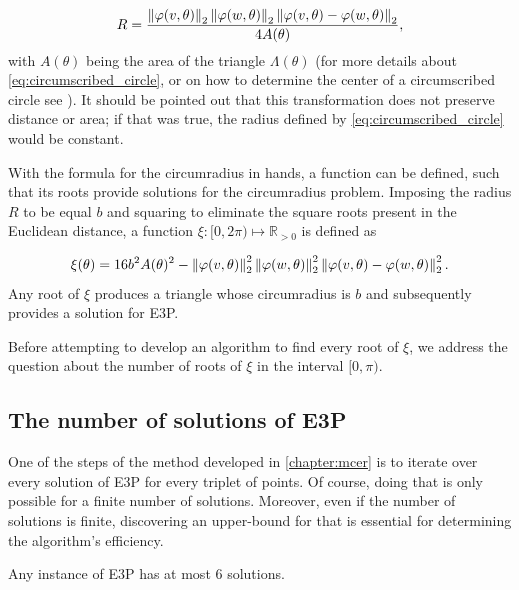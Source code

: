 \begin{equation}\label{eq:circumscribed_circle}
R = \dfrac{\left\lVert\varphi(v, \theta)\right\rVert_{2}\left\lVert\varphi(w, \theta)\right\rVert_{2}\left\lVert\varphi(v, \theta)-\varphi(w, \theta)\right\rVert_{2}   }{4A(\theta)},
\end{equation}
with $A(\theta)$ being the area of the triangle $\Lambda(\theta)$ (for more details about \autoref{eq:circumscribed_circle}, or on how to determine the center of a circumscribed circle see ). It should be pointed out that this transformation does not preserve distance or area; if that was true, the radius defined by \autoref{eq:circumscribed_circle} would be constant.

With the formula for the circumradius in hands, a function can be defined, such that its roots provide solutions for the circumradius problem.
Imposing the radius $R$ to be equal $b$ and squaring to eliminate the square roots present in the Euclidean distance, a function $\xi : [0, 2\pi) \mapsto \mathbb{R}_{>0}$ is defined as 

\begin{equation}\label{eq:circumscribed_circle_b}
\xi(\theta) = 16b^2A(\theta)^2 - \left\lVert\varphi(v, \theta)\right\rVert_{2}^2\left\lVert\varphi(w, \theta)\right\rVert_{2}^2\left\lVert\varphi(v, \theta)-\varphi(w, \theta)\right\rVert_{2}^2.
\end{equation}
Any root of $\xi$ produces a triangle whose circumradius is $b$ and subsequently provides a solution for E3P.

Before attempting to develop an algorithm to find every root of $\xi$, we address the question about the number of roots of $\xi$ in the interval $[0, \pi)$.

\subsection{The number of solutions of E3P}

One of the steps of the method developed in \autoref{chapter:mcer} is to iterate over every solution of E3P for every triplet of points. Of course, doing that is only possible for a finite number of solutions. Moreover, even if the number of solutions is finite, discovering an upper-bound for that is essential for determining the algorithm's efficiency.

\begin{lema}\label{lema:e3p}
	Any instance of E3P has at most $6$ solutions.
\end{lema}

